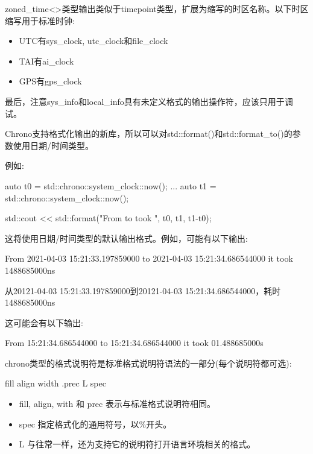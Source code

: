 zoned\_time<>类型输出类似于timepoint类型，扩展为缩写的时区名称。以下时区缩写用于标准时钟:

\begin{itemize}
\item 
UTC有sys\_clock, utc\_clock和file\_clock

\item 
TAI有ai\_clock

\item 
GPS有gps\_clock
\end{itemize}

最后，注意sys\_info和local\_info具有未定义格式的输出操作符，应该只用于调试。


Chrono支持格式化输出的新库，所以可以对std::format()和std::format\_to()的参数使用日期/时间类型。

例如:

\begin{cpp}
auto t0 = std::chrono::system_clock::now();
...
auto t1 = std::chrono::system_clock::now();

std::cout << std::format("From {} to {}\nit took {}\n", t0, t1, t1-t0);
\end{cpp}

这将使用日期/时间类型的默认输出格式。例如，可能有以下输出:

\begin{shell}
From 2021-04-03 15:21:33.197859000 to 2021-04-03 15:21:34.686544000
it took 1488685000ns
\end{shell}

从20121-04-03 15:21:33.197859000到20121-04-03 15:21:34.686544000，耗时1488685000ns


这可能会有以下输出:

\begin{shell}
From 15:21:34.686544000 to 15:21:34.686544000 it took 01.488685000s
\end{shell}

chrono类型的格式说明符是标准格式说明符语法的一部分(每个说明符都可选):

\begin{shell}
fill align width .prec L spec
\end{shell}

\begin{itemize}
\item 
fill, align, with 和 prec 表示与标准格式说明符相同。

\item 
spec 指定格式化的通用符号，以\%开头。

\item 
L 与往常一样，还为支持它的说明符打开语言环境相关的格式。
\end{itemize}

